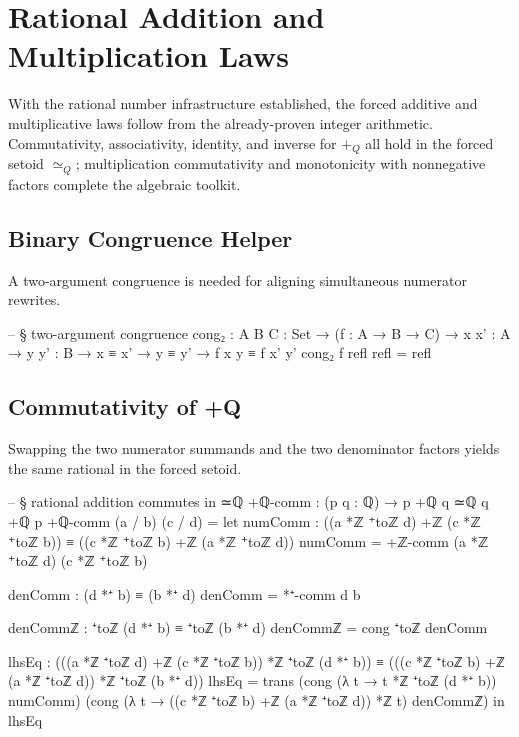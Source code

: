 \documentclass[11pt,a4paper]{book}
\def\mathbb#1{#1}%
\def\texorpdfstring#1#2{#2}%
\begin{document}
\chapter{Rational Addition and Multiplication Laws}
\label{ch:rational-addition-multiplication}

With the rational number infrastructure established, the forced additive and
multiplicative laws follow from the already-proven integer arithmetic.
Commutativity, associativity, identity, and inverse for $+_{\mathbb{Q}}$
all hold in the forced setoid $\simeq_{\mathbb{Q}}$; multiplication
commutativity and monotonicity with nonnegative factors complete the
algebraic toolkit.

\section{Binary Congruence Helper}

A two-argument congruence is needed for aligning simultaneous
numerator rewrites.

\begin{code}
-- § two-argument congruence
cong₂ : {A B C : Set} → (f : A → B → C) → {x x' : A} → {y y' : B} → x ≡ x' → y ≡ y' → f x y ≡ f x' y'
cong₂ f refl refl = refl
\end{code}

\section{Commutativity of \texorpdfstring{$+_{\mathbb{Q}}$}{+Q}}

Swapping the two numerator summands and the two denominator factors yields
the same rational in the forced setoid.

\begin{code}
-- § rational addition commutes in ≃ℚ
+ℚ-comm : (p q : ℚ) → p +ℚ q ≃ℚ q +ℚ p
+ℚ-comm (a / b) (c / d) =
  let
    numComm : ((a *ℤ ⁺toℤ d) +ℤ (c *ℤ ⁺toℤ b)) ≡ ((c *ℤ ⁺toℤ b) +ℤ (a *ℤ ⁺toℤ d))
    numComm = +ℤ-comm (a *ℤ ⁺toℤ d) (c *ℤ ⁺toℤ b)

    denComm : (d *⁺ b) ≡ (b *⁺ d)
    denComm = *⁺-comm d b

    denCommℤ : ⁺toℤ (d *⁺ b) ≡ ⁺toℤ (b *⁺ d)
    denCommℤ = cong ⁺toℤ denComm

    lhsEq : (((a *ℤ ⁺toℤ d) +ℤ (c *ℤ ⁺toℤ b)) *ℤ ⁺toℤ (d *⁺ b))
             ≡
            (((c *ℤ ⁺toℤ b) +ℤ (a *ℤ ⁺toℤ d)) *ℤ ⁺toℤ (b *⁺ d))
    lhsEq =
      trans
        (cong (λ t → t *ℤ ⁺toℤ (d *⁺ b)) numComm)
        (cong (λ t → ((c *ℤ ⁺toℤ b) +ℤ (a *ℤ ⁺toℤ d)) *ℤ t) denCommℤ)
  in
  lhsEq
\end{code}
\end{document}
